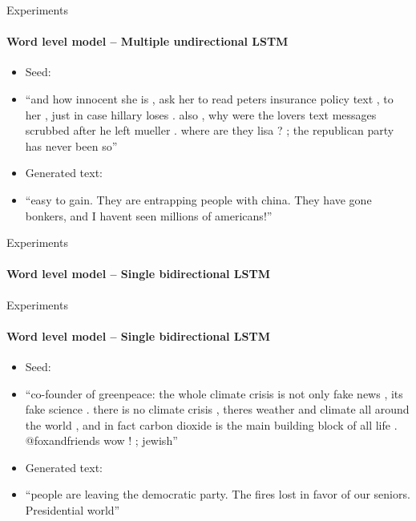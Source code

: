 \documentclass{beamer}
\begin{document}
\begin{frame}{Experiments}
\framesubtitle{Word level model -- Multiple undirectional LSTM}
\begin{itemize}
\item Seed:
\item[] ``and how innocent she is , ask her to read peters insurance policy text , to her , just in case hillary loses . also , why were the lovers text messages scrubbed after he left mueller . where are they lisa ? ; the republican party has never been so''
\vspace{5mm}
\item Generated text:
\item[] ``easy to gain. They are entrapping people with china. They have gone bonkers, and I havent seen millions of americans!''
\end{itemize}
\end{frame}

\begin{frame}{Experiments}
\framesubtitle{Word level model -- Single bidirectional LSTM}
\end{frame}

\begin{frame}{Experiments}
\framesubtitle{Word level model -- Single bidirectional LSTM}
\begin{itemize}
\item Seed:
\item[] ``co-founder of greenpeace: the whole climate crisis is not only fake news , its fake science . there is no climate crisis , theres weather and climate all around the world , and in fact carbon dioxide is the main building block of all life . @foxandfriends wow ! ; jewish''
\vspace{5mm}
\item Generated text:
\item[] ``people are leaving the democratic party. The fires lost in favor of our seniors. Presidential world''
\end{itemize}
\end{frame}
\end{document}
